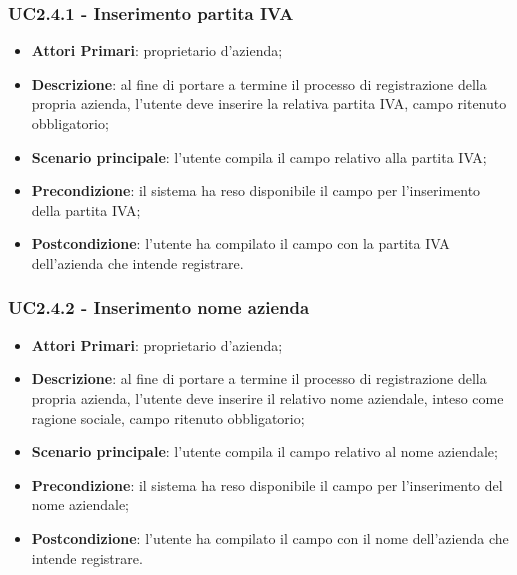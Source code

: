 \subsubsection{UC2.4.1 - Inserimento partita IVA}
\begin{itemize}
	\item \textbf{Attori Primari}: proprietario d'azienda;
	\item \textbf{Descrizione}: al fine di portare a termine il processo di registrazione della propria azienda, l'utente deve inserire la relativa partita IVA, campo ritenuto obbligatorio;
	\item \textbf{Scenario principale}: l'utente compila il campo relativo alla partita IVA;
	\item \textbf{Precondizione}: il sistema ha reso disponibile il campo per l'inserimento della partita IVA;
	\item \textbf{Postcondizione}: l'utente ha compilato il campo con la partita IVA dell'azienda che intende registrare.
\end{itemize}
\subsubsection{UC2.4.2 - Inserimento nome azienda}
\begin{itemize}
	\item \textbf{Attori Primari}: proprietario d'azienda;
	\item \textbf{Descrizione}: al fine di portare a termine il processo di registrazione della propria azienda, l'utente deve inserire il relativo nome aziendale, inteso come ragione sociale, campo ritenuto obbligatorio;
	\item \textbf{Scenario principale}: l'utente compila il campo relativo al nome aziendale;
	\item \textbf{Precondizione}: il sistema ha reso disponibile il campo per l'inserimento del nome aziendale;
	\item \textbf{Postcondizione}: l'utente ha compilato il campo con il nome dell'azienda che intende registrare.
\end{itemize}

